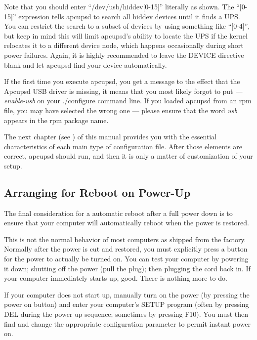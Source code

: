 Note that you should enter ``/dev/usb/hiddev[0-15]'' literally as shown.  The
``[0-15]'' expression tells apcupsd to search all hiddev devices until it
finds a UPS. You can restrict the search to a subset of devices by using
something like ``[0-4]'', but keep in mind this will limit apcupsd's ability
to locate the UPS if the kernel relocates it to a different device node, which
happens occasionally during short power failures. Again, it is highly
recommended to leave the DEVICE directive blank and let apcupsd find your
device automatically.  

If the first time you execute apcupsd, you get a message to the effect that
the Apcupsd USB driver is missing, it means that you most likely forgot to put
{\it {---}enable-usb} on your ./configure command line. If you loaded apcupsd
from an rpm file, you may have selected the wrong one {---} please ensure that
the word {\it usb} appears in the rpm package name.  

The next chapter (see 
) of this
manual provides you with the essential characteristics of each main type of
configuration file.  After those elements are correct, apcupsd should run, and
then it is only a matter of customization of your setup. 

\label{Arranging-for-Reboot-on-Power_002dUp}

\subsection*{Arranging for Reboot on Power-Up}

\label{index-Reboot-on-power-up-60}
\label{index-Power-up_002c-reboot-61}
The final consideration for a automatic reboot after a full power down is to
ensure that your computer will automatically reboot when the power is
restored.  

This is not the normal behavior of most computers as shipped from the factory.
Normally after the power is cut and restored, you must explicitly press a
button for the power to actually be turned on. You can test your computer by
powering it down; shutting off the power (pull the plug); then plugging the
cord back in. If your computer immediately starts up, good. There is nothing
more to do.  

If your computer does not start up, manually turn on the power (by pressing
the power on button) and enter your computer's SETUP program (often by
pressing DEL during the power up sequence; sometimes by pressing F10). You
must then find and change the appropriate configuration parameter to permit
instant power on.  

